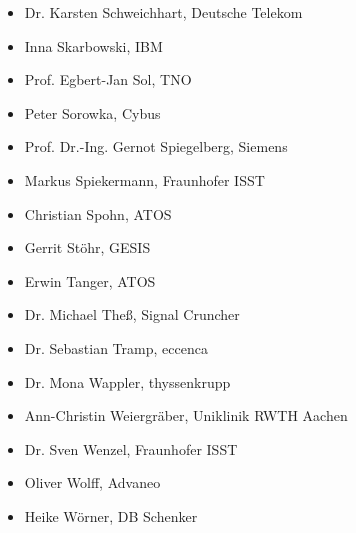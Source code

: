 \begin{multicols}{2}
\begin{itemize}
	\item 	Dr. Karsten Schweichhart, Deutsche Telekom
	\item 	Inna Skarbowski, IBM
	\item 	Prof. Egbert-Jan Sol, TNO
	\item 	Peter Sorowka, Cybus
	\item 	Prof. Dr.-Ing. Gernot Spiegelberg, Siemens
	\item 	Markus Spiekermann, Fraunhofer ISST
	\item 	Christian Spohn, ATOS
	\item 	Gerrit Stöhr, GESIS
	\item 	Erwin Tanger, ATOS
	\item 	Dr. Michael Theß, Signal Cruncher
	\item 	Dr. Sebastian Tramp, eccenca
	\item 	Dr. Mona Wappler, thyssenkrupp
	\item 	Ann-Christin Weiergräber, Uniklinik RWTH Aachen
	\item 	Dr. Sven Wenzel, Fraunhofer ISST
	\item 	Oliver Wolff, Advaneo
	\item 	Heike Wörner, DB Schenker


\vspace{\baselineskip}

\end{itemize}
\end{multicols}
